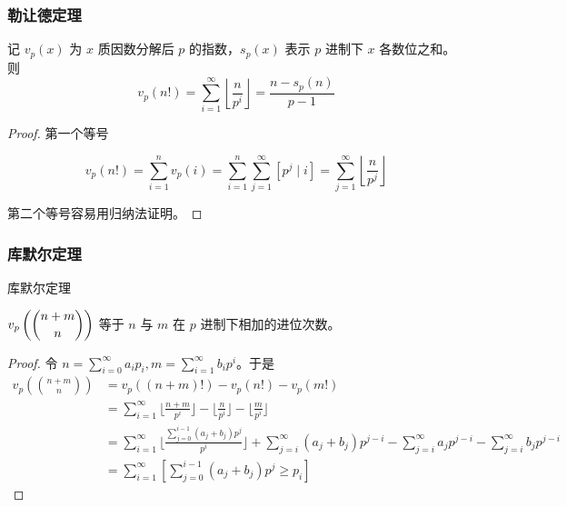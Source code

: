 \documentclass[../main.tex]{subfiles}
\begin{document}
\subsubsection{勒让德定理}

\begin{frame}
\begin{theo}[勒让德定理]
记 $v_p(x)$ 为 $x$ 质因数分解后 $p$ 的指数，$s_p(x)$ 表示 $p$ 进制下 $x$ 各数位之和。则
$$
v_p(n!)=\sum_{i=1}^{\infty}\left\lfloor \frac{n}{p^i}\right\rfloor=\frac{n-s_p(n)}{p-1}
$$
\end{theo} \pause

\begin{proof}
第一个等号

$$
v_p(n!)=\sum_{i=1}^nv_p(i)=\sum_{i=1}^n\sum_{j=1}^{\infty}[p^j\mid i]=\sum_{j=1}^{\infty}\left\lfloor\frac{n}{p^j}\right\rfloor
$$

第二个等号容易用归纳法证明。
\end{proof}
\end{frame}

\subsubsection{库默尔定理}

\begin{frame}{库默尔定理}
\begin{theo}[库默尔定理]
$v_p\left(\dbinom{n+m}{n}\right)$ 等于 $n$ 与 $m$ 在 $p$ 进制下相加的进位次数。
\end{theo}
\end{frame}

\begin{frame}
\begin{proof}
令 $n=\sum\limits_{i=0}^{\infty} a_ip_i,m=\sum\limits_{i=1}^{\infty}b_ip^i$。于是
$$
\begin{aligned}
v_p\left(\binom{n+m}{n} \right)&=v_p((n+m)!)-v_p(n!)-v_p(m!)\\
&=\sum_{i=1}^{\infty}\lfloor\frac{n+m}{p^i}\rfloor-\lfloor\frac{n}{p^i}\rfloor-\lfloor\frac{m}{p^i}\rfloor\\
&=\sum_{i=1}^{\infty}\lfloor\frac{\sum_{j=0}^{i-1}(a_j+b_j)p^j}{p^i} \rfloor+\sum_{j=i}^{\infty}(a_j+b_j)p^{j-i}-\sum_{j=i}^{\infty}a_jp^{j-i}-\sum_{j=i}^{\infty}b_jp^{j-i}\\
&=\sum_{i=1}^{\infty}[\sum_{j=0}^{i-1}(a_j+b_j)p^j\ge p_i]
\end{aligned}
$$
\end{proof}
\end{frame}
\end{document}
